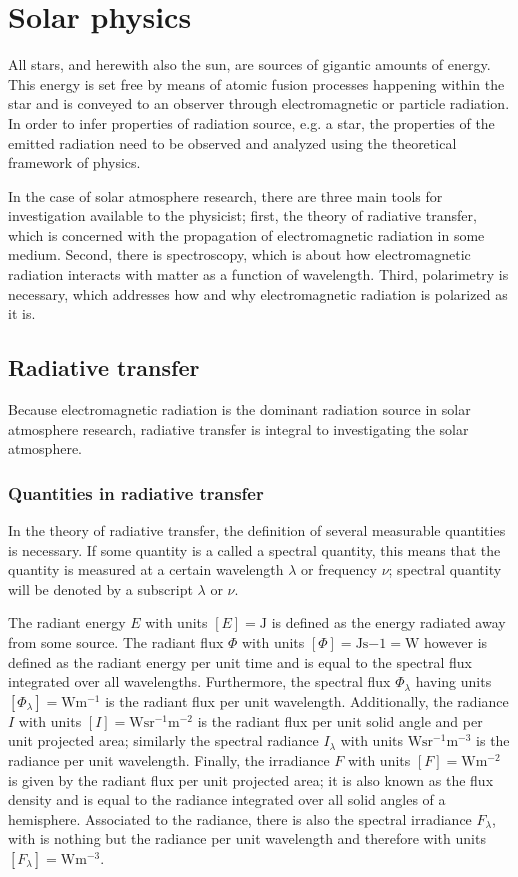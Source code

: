 \documentclass[a4paper,12pt]{report}
\begin{document}
\chapter{Solar physics}
All stars, and herewith also the sun, are sources of gigantic amounts of energy. This energy is set free by means of atomic fusion processes happening within the star and is conveyed to an observer through electromagnetic or particle radiation. In order to infer properties of radiation source, e.g. a star, the properties of the emitted radiation need to be observed and analyzed using the theoretical framework of physics. 

In the case of solar atmosphere research, there are three main tools for investigation available to the physicist; first, the theory of radiative transfer, which is concerned with the propagation of electromagnetic radiation in some medium. Second, there is spectroscopy, which is about how electromagnetic radiation interacts with matter as a function of wavelength. Third, polarimetry is necessary, which addresses how and why electromagnetic radiation is polarized as it is.

\section{Radiative transfer}
Because electromagnetic radiation is the dominant radiation source in solar atmosphere research, radiative transfer is integral to investigating the solar atmosphere.

\subsection{Quantities in radiative transfer}
In the theory of radiative transfer, the definition of several measurable quantities is necessary. If some quantity is a called a spectral quantity, this means that the quantity is measured at a certain wavelength $\lambda$ or frequency $\nu$; spectral quantity will be denoted by a subscript $\lambda$ or $\nu$. 

The radiant energy $E$ with units $[E] = \si{\joule}$ is defined as the energy radiated away from some source. The radiant flux $\Phi$ with units $[\Phi] = \si{\joule\second{-1}=\watt}$ however is defined as the radiant energy per unit time and is equal to the spectral flux integrated over all wavelengths. Furthermore, the spectral flux $\Phi_\lambda$ having units $[\Phi_\lambda] = \si{\watt\meter^{-1}}$ is the radiant flux per unit wavelength. Additionally, the radiance $I$ with units $[I]=\si{\watt\steradian^{-1}\meter^{-2}}$ is the radiant flux per unit solid angle and per unit projected area; similarly the spectral radiance $I_\lambda$ with units $\si{\watt\steradian^{-1}\meter^{-3}}$ is the radiance per unit wavelength. Finally, the irradiance $F$ with units $[F] = \si{\watt\meter^{-2}}$ is given by the radiant flux per unit projected area; it is also known as the flux density and is equal to the radiance integrated over all solid angles of a hemisphere. Associated to the radiance, there is also the spectral irradiance $F_{\lambda}$, with is nothing but the radiance per unit wavelength and therefore with units $[F_{\lambda}]=\si{\watt\meter^{-3}}$.
\end{document}
